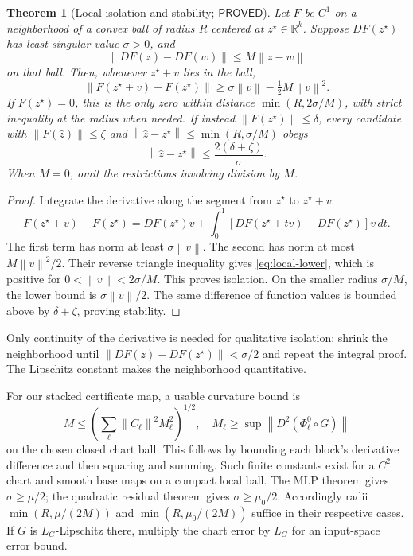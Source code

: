 \documentclass[12pt,a4paper]{article}
\theoremstyle{readable}
\newtheorem{theorem}{Theorem}[section]
\theoremstyle{definition}\newtheorem{example}[theorem]{Example}
\newcommand{\R}{\mathbb R}\newcommand{\rank}{\operatorname{rank}}
\newcommand{\norm}[1]{\left\|#1\right\|}
\newcommand{\PP}{\mathsf{PROVED}}\newcommand{\FF}{\mathsf{FALSE}}
\begin{document}
\begin{theorem}[Local isolation and stability; \(\PP\)]\label{thm:local}
Let \(F\) be \(C^1\) on a neighborhood of a convex ball of radius \(R\) centered at \(z^\star\in\R^k\). Suppose \(DF(z^\star)\) has least singular value \(\sigma>0\), and
\[
\norm{DF(z)-DF(w)}\le M\norm{z-w}
\]
on that ball. Then, whenever \(z^\star+v\) lies in the ball,
\begin{equation}\label{eq:local-lower}
\norm{F(z^\star+v)-F(z^\star)}
\ge\sigma\norm v-\tfrac12M\norm v^2.
\end{equation}
If \(F(z^\star)=0\), this is the only zero within distance \(\min(R,2\sigma/M)\), with strict inequality at the radius when needed. If instead \(\norm{F(z^\star)}\le\delta\), every candidate with \(\norm{F(\widehat z)}\le\zeta\) and
\(\norm{\widehat z-z^\star}\le\min(R,\sigma/M)\) obeys
\[
\norm{\widehat z-z^\star}\le\frac{2(\delta+\zeta)}{\sigma}.
\]
When \(M=0\), omit the restrictions involving division by \(M\).
\end{theorem}
\begin{proof}
Integrate the derivative along the segment from \(z^\star\) to \(z^\star+v\):
\[
F(z^\star+v)-F(z^\star)
=DF(z^\star)v+
\int_0^1[DF(z^\star+tv)-DF(z^\star)]v\,dt.
\]
The first term has norm at least \(\sigma\norm v\). The second has norm at most \(M\norm v^2/2\). Their reverse triangle inequality gives \eqref{eq:local-lower}, which is positive for \(0<\norm v<2\sigma/M\). This proves isolation. On the smaller radius \(\sigma/M\), the lower bound is \(\sigma\norm v/2\). The same difference of function values is bounded above by \(\delta+\zeta\), proving stability.
\end{proof}
Only continuity of the derivative is needed for qualitative isolation: shrink the neighborhood until \(\norm{DF(z)-DF(z^\star)}<\sigma/2\) and repeat the integral proof. The Lipschitz constant makes the neighborhood quantitative.

For our stacked certificate map, a usable curvature bound is
\[
M\le\left(\sum_\ell\norm{C_\ell}^2 M_\ell^2\right)^{1/2},
\quad M_\ell\ge\sup\norm{D^2(\Phi_\ell^0\circ G)}
\]
on the chosen closed chart ball. This follows by bounding each block's derivative difference and then squaring and summing. Such finite constants exist for a \(C^2\) chart and smooth base maps on a compact local ball. The MLP theorem gives \(\sigma\ge\mu/2\); the quadratic residual theorem gives \(\sigma\ge\mu_0/2\). Accordingly radii \(\min(R,\mu/(2M))\) and \(\min(R,\mu_0/(2M))\) suffice in their respective cases. If \(G\) is \(L_G\)-Lipschitz there, multiply the chart error by \(L_G\) for an input-space error bound.
\end{document}
